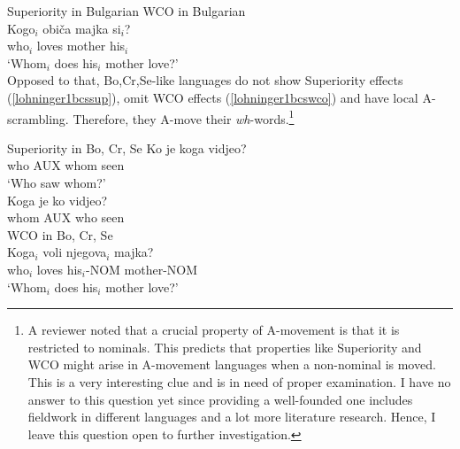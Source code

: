 \documentclass[output=paper,colorlinks,citecolor=brown]{langscibook}
\begin{document}
\ea\label{lohninger1bgsup}
  {Superiority} in {Bulgarian} \citep[30]{richards1997}
  \z
\ex\label{lohninger1bgwco}
  {WCO} in {Bulgarian} \citep[32]{richards1997}\\
  \gll * Kogo$_{i}$ obi\v{c}a majka si$_{i}$?\\
  {} who$_{i}$ loves mother his$_{i}$\\
  \glt \phantom{*} `Whom$_{i}$ does his$_{i}$ mother love?' \\
\z
Opposed to that, Bo,Cr,Se-like languages do not show Superiority effects (\ref{lohninger1bcssup}), omit WCO effects (\ref{lohninger1bcswco}) and have local A-scrambling. Therefore, they A-move their \textit{wh}-words.\footnote{A reviewer noted that a crucial property of A-movement is that it is restricted to nominals. This predicts that properties like Superiority and WCO might arise in A-movement languages when a non-nominal is moved. This is a very interesting clue and is in need of proper examination. I have no answer to this question yet since providing a well-founded one includes fieldwork in different languages and a lot more literature research. Hence, I leave this question open to further investigation.}

\ea\label{lohninger1bcssup}
  {Superiority} in {Bo, Cr, Se} \citep[30]{richards1997}
  \ea
    \gll Ko je koga vidjeo?\\
    who AUX whom seen\\
    \glt `Who saw whom?'\\
  \ex
    \gll Koga je ko vidjeo?\\
    whom AUX who seen\\
  \z
\ex\label{lohninger1bcswco}
  WCO in {Bo, Cr, Se} \citep[33]{richards1997}\\
  \gll Koga$_{i}$ voli njegova$_{i}$ majka?\\
  who$_{i}$ loves his$_{i}$-NOM mother-NOM\\
  \glt `Whom$_{i}$ does his$_{i}$ mother love?'\\
\z
\end{document}
